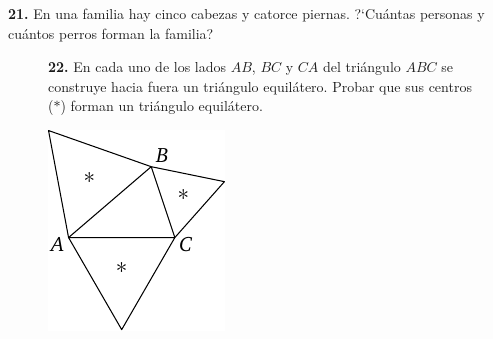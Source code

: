 \documentclass[12pt]{article}  %
\begin{document}
\medskip\noindent
{\bf 21.} En una familia hay cinco cabezas y catorce piernas. ?`Cu\'antas personas y cu\'antos perros forman la familia?
\begin{figure}[h!]
\begin{minipage}[c][][c]{0.7 \textwidth}
{\bf 22.} En cada uno de los lados $AB$, $BC$ y $CA$ del tri\'angulo $ABC$ se construye hacia fuera un tri\'angulo equil\'atero.
Probar que sus centros ($*$) forman un tri\'angulo equil\'atero.\end{minipage}
\hfill
\begin{minipage}[c]{0.2 \textwidth}
\includegraphics[scale=1]{taskbook-6}
\end{minipage}
\end{figure}

\end{document}
